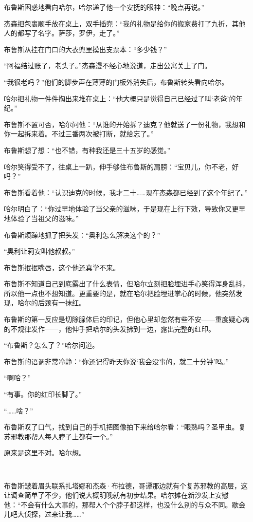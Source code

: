 \documentclass[../main]{subfiles}
\begin{document}
布鲁斯困惑地看向哈尔，哈尔递了他一个安抚的眼神：“晚点再说。”

杰森把包裹顺手放在桌上，双手插兜：“我的礼物是给你的搬家费打了九折，其他人的都写了名字。萨莎，罗伊，走了。”

布鲁斯从挂在门口的大衣兜里摸出支票本：“多少钱？”

“阿福结过账了，老头子。”杰森漫不经心地说道，走出公寓关上了门。

“我很老吗？”他们的脚步声在薄薄的门板外消失后，布鲁斯转头看向哈尔。

哈尔把礼物一件件掏出来堆在桌上：“他大概只是觉得自己已经过了叫‘老爸’的年纪。”

布鲁斯不置可否，哈尔问他：“从谁的开始拆？迪克？他就送了一份礼物，我想和你一起拆来着。不过三番两次被打断，就给忘了。”

布鲁斯想了想：“也不错，有种我还是三十五岁的感觉。”

哈尔笑得受不了，往桌上一趴，伸手够住布鲁斯的肩膀：“宝贝儿，你不老，好吗？”

布鲁斯看着他：“认识迪克的时候，我才二十……现在杰森都已经到了这个年纪了。”

哈尔明白了：“你过早地体验了当父亲的滋味，于是现在上行下效，导致你又更早地体验了当祖父的滋味。”

布鲁斯烦躁地抓了把头发：“奥利怎么解决这个的？”

“奥利让莉安叫他叔叔。”

布鲁斯抿抿嘴唇，这个他还真学不来。

布鲁斯不知道自己到底露出了什么表情，但哈尔立刻把脸埋进手心笑得浑身乱抖，所以他一点也不想知道。更重要的是，就在哈尔把脸埋进掌心的时候，他突然发现，哈尔的后颈有一抹红。

布鲁斯的第一反应是切除腺体后的印记，但他心里却忽然有些不安——重度疑心病的不规律发作——，他伸手把哈尔的头发拂到一边，露出完整的红印。

“布鲁斯？怎么了？”哈尔问道。

布鲁斯的语调非常冷静：“你还记得昨天你说‘我会没事的，就二十分钟’吗。”

“啊哈？”

“有事。你的红印长脚了。”

“……啥？”

布鲁斯叹了口气，找到自己的手机把图像拍下来给哈尔看：“眼熟吗？圣甲虫。复苏邪教那帮人每人脖子上都有一个。”

原来是这里不对。哈尔想。

~\

布鲁斯皱着眉头联系扎塔娜和杰森·布拉德，哥谭那边就有个复苏邪教的高层，这让调查简单了不少，他们说大概明晚就有初步结果。哈尔摊在新沙发上安慰他：“不会有什么大事的，那帮人个个脖子都这样，也没什么别的与众不同。歇会儿吧大侦探，过来让我……”
\end{document}
